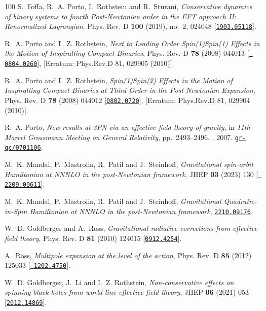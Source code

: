 \begin{thebibliography}{100}
S.~Foffa, R.~A. Porto, I.~Rothstein and R.~Sturani,  {\em {Conservative
  dynamics of binary systems to fourth Post-Newtonian order in the EFT approach
  II: Renormalized Lagrangian}}, Phys. Rev. D {\bf 100} (2019), no.~2, 024048
  [\href{http://www.arXiv.org/abs/1903.05118}{{\tt 1903.05118}}].

R.~A. Porto and I.~Z. Rothstein,  {\em {Next to Leading Order Spin(1)Spin(1)
  Effects in the Motion of Inspiralling Compact Binaries}}, Phys. Rev. D {\bf
  78} (2008) 044013 [\href{http://www.arXiv.org/abs/0804.0260}{{\tt
  0804.0260}}], [Erratum: Phys.Rev.D 81, 029905 (2010)].

R.~A. Porto and I.~Z. Rothstein,  {\em {Spin(1)Spin(2) Effects in the Motion of
  Inspiralling Compact Binaries at Third Order in the Post-Newtonian
  Expansion}}, Phys. Rev. D {\bf 78} (2008) 044012
  [\href{http://www.arXiv.org/abs/0802.0720}{{\tt 0802.0720}}], [Erratum:
  Phys.Rev.D 81, 029904 (2010)].

R.~A. Porto,  {\em {New results at 3PN via an effective field theory of
  gravity}}, in {\em {11th Marcel Grossmann Meeting on General Relativity}},
  pp.~2493--2496.
, 2007.
\newblock \href{http://www.arXiv.org/abs/gr-qc/0701106}{{\tt gr-qc/0701106}}.

M.~K. Mandal, P.~Mastrolia, R.~Patil and J.~Steinhoff,  {\em {Gravitational
  spin-orbit Hamiltonian at NNNLO in the post-Newtonian framework}}, JHEP {\bf
  03} (2023) 130 [\href{http://www.arXiv.org/abs/2209.00611}{{\tt
  2209.00611}}].

M.~K. Mandal, P.~Mastrolia, R.~Patil and J.~Steinhoff,  {\em {Gravitational
  Quadratic-in-Spin Hamiltonian at NNNLO in the post-Newtonian framework}},
  \href{http://www.arXiv.org/abs/2210.09176}{{\tt 2210.09176}}.

W.~D. Goldberger and A.~Ross,  {\em {Gravitational radiative corrections from
  effective field theory}}, Phys. Rev. D {\bf 81} (2010) 124015
  [\href{http://www.arXiv.org/abs/0912.4254}{{\tt 0912.4254}}].

A.~Ross,  {\em {Multipole expansion at the level of the action}}, Phys. Rev. D
  {\bf 85} (2012) 125033 [\href{http://www.arXiv.org/abs/1202.4750}{{\tt
  1202.4750}}].

W.~D. Goldberger, J.~Li and I.~Z. Rothstein,  {\em {Non-conservative effects on
  spinning black holes from world-line effective field theory}}, JHEP {\bf 06}
  (2021) 053 [\href{http://www.arXiv.org/abs/2012.14869}{{\tt 2012.14869}}].


\end{thebibliography}
